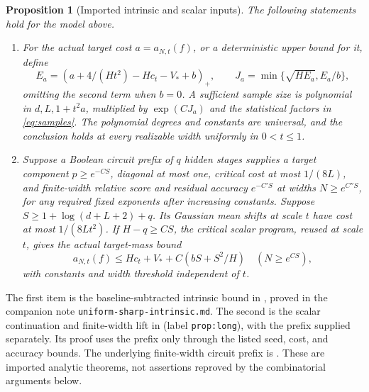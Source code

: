 \documentclass[11pt]{article}
\newtheorem{proposition}[theorem]{Proposition}
\theoremstyle{remark}\newtheorem{remark}[theorem]{Remark}
\begin{document}
\begin{proposition}[Imported intrinsic and scalar inputs]\label{prop:inputs}
The following statements hold for the model above.
\begin{enumerate}
\item For the actual target cost $a=a_{N,t}(f)$, or a deterministic
upper bound for it, define
\[
 E_a=(a+4/(Ht^2)-Hc_t-V_*+b)_+,
 \qquad J_a=\min\{\sqrt{HE_a},E_a/b\},
\]
omitting the second term when $b=0$. A sufficient sample size is
polynomial in $d,L,1+t^2a$, multiplied by $\exp(CJ_a)$ and the
statistical factors in \eqref{eq:samples}. The polynomial degrees
and constants are universal, and the conclusion holds at every
realizable width uniformly in $0<t\le1$.
\item Suppose a Boolean circuit prefix of $q$ hidden stages supplies
a target component $p\ge e^{-CS}$, diagonal at most one, critical
cost at most $1/(8L)$, and finite-width relative score and residual
accuracy $e^{-C'S}$ at widths $N\ge e^{C''S}$, for any required
fixed exponents after increasing constants. Suppose $S\ge
1+\log(d+L+2)+q$. Its Gaussian mean shifts at scale $t$ have cost
at most $1/(8Lt^2)$. If $H-q\ge CS$, the critical scalar program,
reused at scale $t$, gives the actual target-mass bound
\begin{equation}\label{eq:target}
 a_{N,t}(f)\le Hc_t+V_*+C(bS+S^2/H)
 \quad(N\ge e^{CS}),
\end{equation}
with constants and width threshold independent of $t$.
\end{enumerate}
\end{proposition}

The first item is the baseline-subtracted intrinsic bound in
\cite[Proposition 2.1, equation (4)]{uniform}, proved in the companion
note \texttt{uniform-sharp-intrinsic.md}. The second is the scalar
continuation and finite-width lift in
\cite[Proposition 3.3]{uniform} (label
\texttt{prop:long}), with the prefix supplied separately. Its proof
uses the prefix only through the listed seed, cost, and accuracy
bounds. The underlying finite-width circuit prefix is
\cite[Lemma \texttt{lem:critical-finite-circuit-prefix}]{critical}.
These are imported analytic theorems, not assertions reproved by the
combinatorial arguments below.
\end{document}
